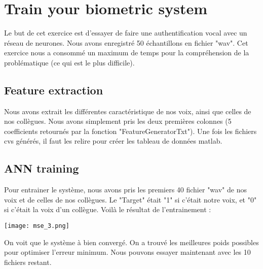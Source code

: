 
\chapter{Train your biometric system} %

\label{Chapitre 4.1} %


Le but de cet exercice est d'essayer de faire une authentification vocal avec un réseau de neurones. Nous avons enregistré 50 échantillons en fichier "wav".  Cet exercice nous a consommé un maximum de temps pour la compréhension de la problématique (ce qui est le plus difficile).

\section{Feature extraction}

Nous avons extrait les différentes caractéristique de nos voix, ainsi que celles de nos collègues. Nous avons simplement pris les deux premières colonnes (5 coefficients retournés par la fonction "FeatureGeneratorTxt"). Une fois les fichiers cvs générés, il faut les relire pour créer les tableau de données matlab. \pagebreak

 
\section{ANN training}
Pour entrainer le système, nous avons pris les premiers 40 fichier "wav" de nos voix et de celles de nos collègues.
Le "Target" était "1" si c'était notre voix, et "0" si c'était la voix d'un collègue. Voilà le résultat de l'entrainement :


\begin{center} 
\hspace{15cm}
\texttt{[image: mse\_3.png]}
\end{center}
\vspace{0.5cm} 


On voit que le système à bien convergé. On a trouvé les meilleures poids possibles pour optimiser l'erreur minimum. Nous pouvons essayer maintenant avec les 10 fichiers restant.\pagebreak

